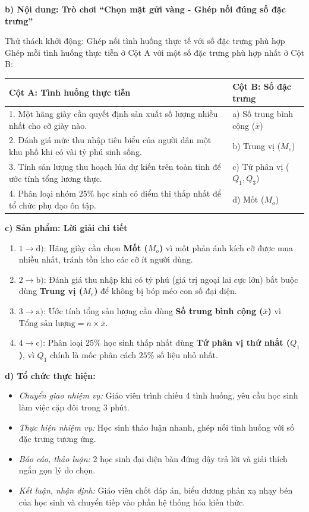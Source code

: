\documentclass[12pt, a4paper]{article}
\begin{document}
\noindent \textbf{b) Nội dung: Trò chơi ``Chọn mặt gửi vàng - Ghép nối đúng số đặc trưng''}
\begin{pedabox}{Thử thách khởi động: Ghép nối tình huống thực tế với số đặc trưng phù hợp}
Ghép mỗi tình huống thực tiễn ở Cột A với một số đặc trưng phù hợp nhất ở Cột B:
\begin{center}
\small
\begin{tabular}{|p{8.5cm}|p{5.5cm}|}
\hline
\textbf{Cột A: Tình huống thực tiễn} & \textbf{Cột B: Số đặc trưng} \\ \hline
1. Một hãng giày cần quyết định sản xuất số lượng nhiều nhất cho cỡ giày nào. & a) Số trung bình cộng ($\bar{x}$) \\ \hline
2. Đánh giá mức thu nhập tiêu biểu của người dân một khu phố khi có vài tỷ phú sinh sống. & b) Trung vị ($M_e$) \\ \hline
3. Tính sản lượng thu hoạch lúa dự kiến trên toàn tỉnh để ước tính tổng lương thực. & c) Tứ phân vị ($Q_1, Q_3$) \\ \hline
4. Phân loại nhóm $25\%$ học sinh có điểm thi thấp nhất để tổ chức phụ đạo ôn tập. & d) Mốt ($M_o$) \\ \hline
\end{tabular}
\end{center}
\end{pedabox}

\noindent \textbf{c) Sản phẩm: Lời giải chi tiết}
\begin{enumerate}[leftmargin=0.6cm]
    \item $1 \to \text{d)}$: Hãng giày cần chọn \textbf{Mốt ($M_o$)} vì mốt phản ánh kích cỡ được mua nhiều nhất, tránh tồn kho các cỡ ít người dùng.
    \item $2 \to \text{b)}$: Đánh giá thu nhập khi có tỷ phú (giá trị ngoại lai cực lớn) bắt buộc dùng \textbf{Trung vị ($M_e$)} để không bị bóp méo con số đại diện.
    \item $3 \to \text{a)}$: Ước tính tổng sản lượng cần dùng \textbf{Số trung bình cộng ($\bar{x}$)} vì $\text{Tổng sản lượng} = n \times \bar{x}$.
    \item $4 \to \text{c)}$: Phân loại $25\%$ học sinh thấp nhất dùng \textbf{Tứ phân vị thứ nhất ($Q_1$)}, vì $Q_1$ chính là mốc phân cách $25\%$ số liệu nhỏ nhất.
\end{enumerate}

\noindent \textbf{d) Tổ chức thực hiện:}
\begin{itemize}[leftmargin=0.8cm]
    \item \textit{Chuyển giao nhiệm vụ:} Giáo viên trình chiếu 4 tình huống, yêu cầu học sinh làm việc cặp đôi trong 3 phút.
    \item \textit{Thực hiện nhiệm vụ:} Học sinh thảo luận nhanh, ghép nối tình huống với số đặc trưng tương ứng.
    \item \textit{Báo cáo, thảo luận:} 2 học sinh đại diện bàn đứng dậy trả lời và giải thích ngắn gọn lý do chọn.
    \item \textit{Kết luận, nhận định:} Giáo viên chốt đáp án, biểu dương phản xạ nhạy bén của học sinh và chuyển tiếp vào phần hệ thống hóa kiến thức.
\end{itemize}
\end{document}
